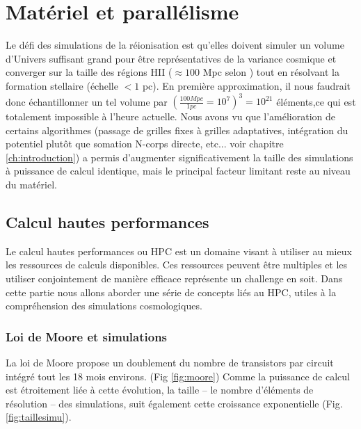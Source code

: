 
\chapter{Matériel et parallélisme}
\label{sec:materiel}

Le défi des simulations de la réionisation est qu'elles doivent simuler un volume d'Univers suffisant grand pour être représentatives de la variance cosmique et converger sur la taille des régions HII ($\approx 100$ Mpc selon \cite{iliev_cosmological_2006}) tout en résolvant la formation stellaire (échelle $<1$ pc).
En première approximation, il nous faudrait donc échantillonner un tel volume par $\left( \frac{100Mpc}{1pc} = 10^7 \right) ^3 = 10^{21}$ éléments,ce qui est totalement impossible à l'heure actuelle.
Nous avons vu que l'amélioration de certains algorithmes (passage de grilles fixes à grilles adaptatives, intégration du potentiel plutôt que somation N-corps directe, etc... voir chapitre \ref{ch:introduction}) a permis d'augmenter significativement la taille des simulations à puissance de calcul identique, mais le principal facteur limitant reste au niveau du matériel.

\section{Calcul hautes performances}

Le calcul hautes performances ou \ac{HPC} est un domaine visant à utiliser au mieux les ressources de calculs disponibles.
Ces ressources peuvent être multiples et les utiliser conjointement de manière efficace représente un challenge en soit.
Dans cette partie nous allons aborder une série de concepts liés au \ac{HPC}, utiles à la compréhension des simulations cosmologiques.


\subsection{Loi de Moore et simulations}
La loi de Moore \citep{moore1965cramming} propose un doublement du nombre de transistors par circuit intégré tout les 18 mois environs. (Fig \ref{fig:moore})
Comme la puissance de calcul est étroitement liée à cette évolution, la taille -- le nombre d'éléments de résolution -- des simulations, suit également cette croissance exponentielle (Fig. \ref{fig:taillesimu}).

